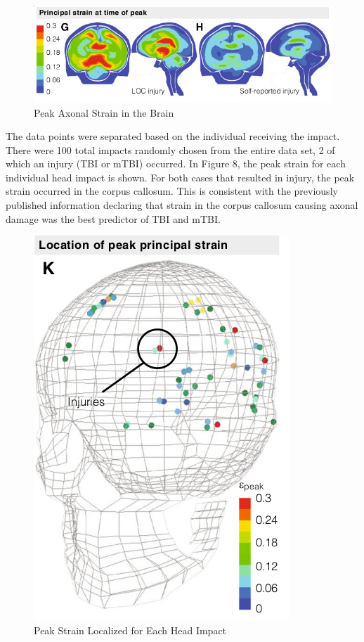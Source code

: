 \documentclass[%
 aip,
 amsmath,amssymb,
 reprint,%
 floatfix,%
]{revtex4-1}
\begin{document}
\begin{figure}
	\centering
	\includegraphics[scale=0.325]{axonalstrain.png}
	\caption{Peak Axonal Strain in the Brain}
\end{figure}

The data points were separated based on the individual receiving the impact. There were 100 total impacts randomly chosen from the entire data set, 2 of which an injury (TBI or mTBI) occurred. In Figure 8, the peak strain for each individual head impact is shown. For both cases that resulted in injury, the peak strain occurred in the corpus callosum. This is consistent with the previously published information declaring that strain in the corpus callosum causing axonal damage was the best predictor of TBI and mTBI.

\begin{figure}
	\centering
	\includegraphics[scale=0.4]{peakstrain.png}
	\caption{Peak Strain Localized for Each Head Impact}
\end{figure}
\end{document}
